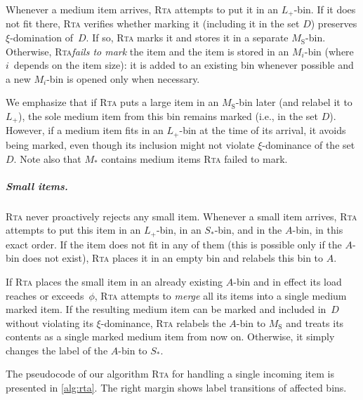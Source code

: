 \documentclass[a4paper,USenglish,cleveref]{lipics-v2019}
\newcommand{\M}{\ensuremath{M_\mathrm{S}}\xspace}
\newcommand{\A}{\ensuremath{A}\xspace}
\newcommand{\ST}{\ensuremath{S_*}\xspace}
\newcommand{\MT}{\ensuremath{M_*}\xspace}
\newcommand{\MTI}[1]{\ensuremath{M_{#1}\xspace}}
\newcommand{\LT}{\ensuremath{L_+}\xspace}
\newcommand{\smallBoundary}{\ensuremath{\phi}}
\newcommand{\g}{\ensuremath{\xi}}
\newcommand{\ALG}{\textsc{Rta}\xspace}
\begin{document}
Whenever a medium item arrives, \ALG attempts to put it in an \LT-bin. If it
does not fit there, \ALG verifies whether marking it (including it in the set
$D$) preserves $\g$-domination of~$D$. If so, \ALG marks it and stores it in a
separate \M-bin. Otherwise, \ALG \emph{fails to mark} the item and the item is
stored in an $\MTI{i}$-bin (where $i$~depends on the item size): it is added to
an existing bin whenever possible and a new $\MTI{i}$-bin is opened only when
necessary.

We emphasize that if \ALG puts a large item in an \M-bin later (and relabel it
to \LT), the sole medium item from this bin remains marked (i.e., in the set $D$).
However, if a medium item fits in an \LT-bin at the time of its arrival, it
avoids being marked, even though its inclusion might not violate $\g$-dominance
of the set $D$. Note also that $\MT$ contains medium items \ALG failed to mark.

\subparagraph{Small items.}

\ALG never proactively rejects any small item. Whenever a small item arrives,
\ALG attempts to put this item in an \LT-bin, in an \ST-bin, and in the \A-bin,
in this exact order. If the item does not fit in any of them (this is possible
only if the \A-bin does not exist), \ALG places it in an empty bin and relabels
this bin to \A.

If \ALG places the small item in an already existing \A-bin and in effect its load
reaches or exceeds~$\smallBoundary$, \ALG attempts to \emph{merge} all its items into a single
medium marked item. If the resulting medium item can be marked
and included in~$D$ without violating its $\g$-dominance, 
\ALG relabels the \A-bin to \M and treats its contents as a single marked medium
item from now on. Otherwise, it simply changes the label of the \A-bin to \ST.


\medskip

The pseudocode of our algorithm \ALG for handling a single incoming item is presented in \cref{alg:rta}.
The right margin shows label transitions of affected bins. 
\end{document}
